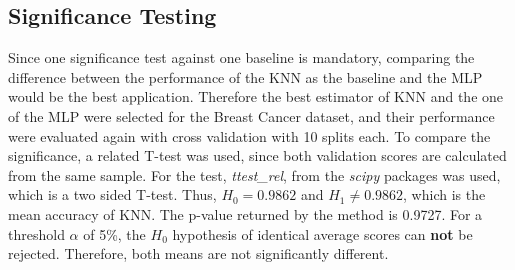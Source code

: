 \documentclass{article}
\begin{document}
\subsection{Significance Testing}
Since one significance test against one baseline is mandatory, comparing the difference between the performance of the KNN as the baseline and the MLP would be the best application. Therefore the best estimator of KNN and the one of the MLP were selected for the Breast Cancer dataset, and their performance were evaluated again with cross validation with 10 splits each. To compare the significance, a related T-test was used, since both validation scores are calculated from the same sample. For the test, \textit{ttest\_rel}, from the \textit{scipy} packages was used, which is a two sided T-test. Thus, $H_0=0.9862$ and $H_1\neq0.9862$, which is the mean accuracy of KNN. The p-value returned by the method is 0.9727. For a threshold $\alpha$ of 5\%, the $H_0$ hypothesis of identical average scores can \textbf{not} be rejected. Therefore, both means are not significantly different.
\end{document}
